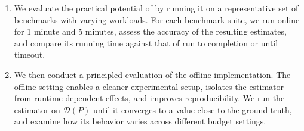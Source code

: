 
\begin{enumerate}[label=\textbf{(\Alph*)}, leftmargin=2em]
\item \label{phase:online}
We evaluate the practical potential of \testor by running it on a representative set of benchmarks with varying workloads.
For each benchmark suite, we run online \testor for 1 minute and 5 minutes, assess the accuracy of the resulting estimates, and compare its running time against that of \jmc run to completion or until timeout.
\item \label{phase:acp} We then conduct a principled evaluation of the offline implementation. The offline setting enables a cleaner experimental setup, isolates the estimator from runtime-dependent effects, and improves reproducibility. We run the estimator on $\mathcal{D}(P)$ until it converges to a value close to the ground truth, and examine how its behavior varies across different budget settings.


\end{enumerate}  


